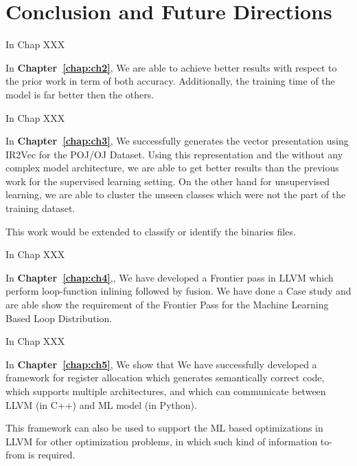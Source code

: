 \chapter{Conclusion and Future Directions}
\label{chap:conclude}


In Chap XXX

In \textbf{Chapter~\ref{chap:ch2}}, We are able to achieve better results with respect to the prior work in term of both accuracy. Additionally, the training time of the model is far better then the others. \newline

In Chap XXX

In \textbf{Chapter~\ref{chap:ch3}}, We successfully generates the vector presentation using IR2Vec for the POJ/OJ Dataset. Using this representation and the without any complex model architecture, we are able to get better results than the previous work for the supervised learning setting. On the other hand for unsupervised learning, we are  able to cluster the unseen classes which were not the part of the training dataset.

This work would be extended to classify or identify the binaries files. \newline

In Chap XXX

In \textbf{Chapter~\ref{chap:ch4}},, We have developed a Frontier pass in LLVM which perform loop-function inlining followed by fusion. We have done a Case study and are able show the requirement of the Frontier Pass for the Machine Learning Based Loop Distribution. \newline

In Chap XXX \newline

In \textbf{Chapter~\ref{chap:ch5}}, We show that We have successfully developed a framework for register allocation which generates semantically correct code, which supports multiple architectures, and which can communicate between LLVM (in C++) and ML model (in Python).

This framework can also be used to support the ML based optimizations in LLVM for other optimization problems, in which such kind of information to-from is required.
